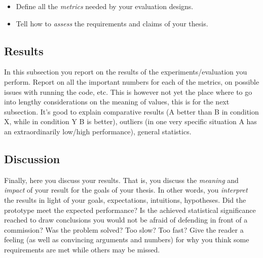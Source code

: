 \begin{itemize}
\item[\Square] Define all the \emph{metrics} needed by your evaluation designs.
\item[\Square] Tell how to \emph{assess} the requirements and claims of your thesis.
\end{itemize}


\subsection{Results}
In this subsection you report on the results of the experiments/evaluation you perform. Report on all the important numbers for each of the metrics, on possible issues with running the code, etc. This is however not yet the place where to go into lengthy considerations on the meaning of values, this is for the next subsection. It's good to explain comparative results (A better than B in condition X, while in condition Y B is better), outliers (in one very specific situation A has an extraordinarily low/high performance), general statistics.

\subsection{Discussion}
Finally, here you discuss your results. That is, you discuss the \emph{meaning} and \emph{impact} of your result for the goals of your thesis. In other words, you \emph{interpret} the results in light of your goals, expectations, intuitions, hypotheses. Did the prototype meet the expected performance? Is the achieved statistical significance reached to draw conclusions you would not be afraid of defending in front of a commission? Was the problem solved? Too slow? Too fast? Give the reader a feeling (as well as convincing arguments and numbers) for why you think some requirements are met while others may be missed. 